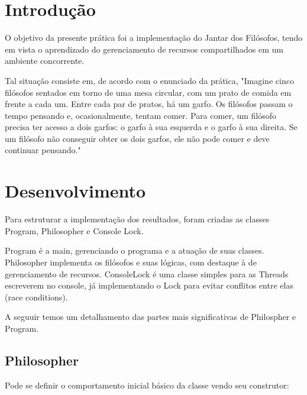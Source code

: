 \documentclass[
	12pt,				%
	oneside,			%
	a4paper,			%
	english,			%
	brazil,				%
	]{abntex2}
\begin{document}
\frenchspacing 

\imprimircapa

{
\ABNTEXchapterfont

\textual

\section{Introdução}

O objetivo da presente prática foi a implementação do Jantar dos Filósofos, tendo em vista o aprendizado do gerenciamento de recursos compartilhados em um ambiente concorrente.

Tal situação consiste em, de acordo com o enunciado da prática, "Imagine cinco filósofos sentados em torno de uma mesa circular, com um prato de comida em frente a cada um. Entre cada par de pratos, há um garfo. Os filósofos passam o tempo pensando e, ocasionalmente, tentam comer. Para comer, um filósofo precisa ter acesso a dois garfos: o garfo à sua esquerda e o garfo à sua direita. Se um filósofo não conseguir obter os dois garfos, ele não pode comer e deve continuar pensando."

\section{Desenvolvimento}

Para estruturar a implementação dos resultados, foram criadas as classes Program, Philosopher e Console Lock.

Program é a main, gerenciando o programa e a atuação de suas classes. Philosopher implementa os filósofos e suas lógicas, com destaque à de gerenciamento de recursos. ConsoleLock é uma classe simples para as Threads escreverem no console, já implementando o Lock para evitar conflitos entre elas (race conditions).

A seguuir temos um detalhamento das partes mais significativas de Philospher e Program.

\subsection{Philosopher}

Pode se definir o comportamento inicial básico da classe vendo seu construtor:

}
\end{document}
